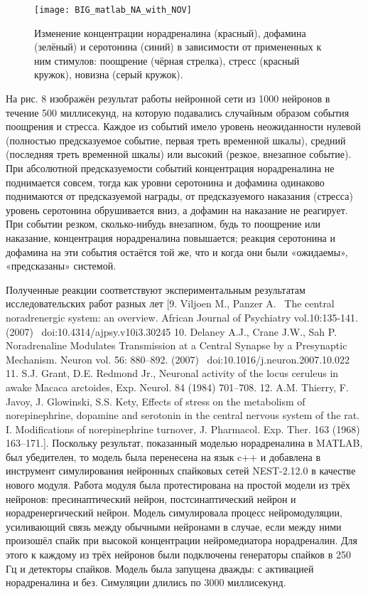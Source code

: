 \begin{figure}
	\centering
	\texttt{[image: BIG\_matlab\_NA\_with\_NOV]}
	\caption{Изменение концентрации норадреналина (красный), дофамина (зелёный) и серотонина (синий) в зависимости от примененных к ним стимулов: поощрение (чёрная стрелка), стресс (красный кружок), новизна (серый кружок).}
	\label{fig:sample_figure}
\end{figure}

На рис. 8 изображён результат работы нейронной сети из 1000 нейронов в течение 500 миллисекунд, на которую подавались случайным образом события поощрения и стресса. Каждое из событий имело уровень неожиданности нулевой (полностью предсказуемое событие, первая треть временной шкалы), средний (последняя треть временной шкалы) или высокий (резкое, внезапное событие).
При абсолютной предсказуемости событий концентрация норадреналина не поднимается совсем, тогда как уровни серотонина и дофамина одинаково поднимаются от предсказуемой награды, от предсказуемого наказания (стресса) уровень серотонина обрушивается вниз, а дофамин на наказание не реагирует.
При событии резком, сколько-нибудь внезапном, будь то поощрение или наказание, концентрация норадреналина повышается; реакция серотонина и дофамина на эти события остаётся той же, что и когда они были «ожидаемы», «предсказаны» системой.


Полученные реакции соответствуют экспериментальным результатам исследовательских работ разных лет [9. Viljoen M., Panzer A.  The central noradrenergic system: an overview. African Journal of Psychiatry vol.10:135-141. (2007)  doi:10.4314/ajpsy.v10i3.30245
10. Delaney A.J., Crane J.W., Sah P. Noradrenaline Modulates Transmission at a
Central Synapse by a Presynaptic Mechanism. Neuron vol. 56: 880–892. (2007)  doi:10.1016/j.neuron.2007.10.022
11. S.J. Grant, D.E. Redmond Jr., Neuronal activity of the locus ceruleus in awake Macaca arctoides, Exp. Neurol. 84 (1984) 701–708.
12. A.M. Thierry, F. Javoy, J. Glowinski, S.S. Kety, Effects of stress on the metabolism of norepinephrine, dopamine and serotonin in the central nervous system of the rat. I. Modifications of norepinephrine turnover, J. Pharmacol. Exp. Ther. 163 (1968) 163–171.]. Поскольку результат, показанный моделью норадреналина в MATLAB, был убедителен, то модель была перенесена на язык c++ и добавлена в инструмент симулирования нейронных спайковых сетей NEST-2.12.0 в качестве нового модуля. Работа модуля была протестирована на простой модели из трёх нейронов: пресинаптический нейрон, постсинаптический нейрон и норадренергический нейрон. Модель симулировала процесс нейромодуляции, усиливающий связь между обычными нейронами в случае, если между ними произошёл спайк при высокой концентрации нейромедиатора норадреналин. Для этого к каждому из трёх нейронов были подключены генераторы спайков в 250 Гц и детекторы спайков. Модель была запущена дважды: с активацией норадреналина и без. Симуляции длились по 3000 миллисекунд.


